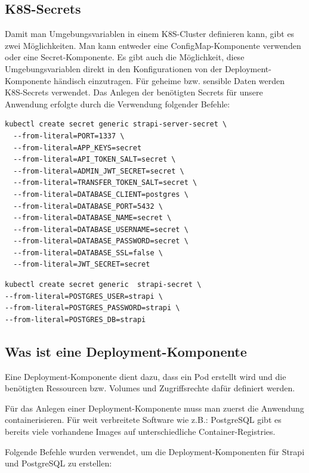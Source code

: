 \subsection{K8S-Secrets}
Damit man Umgebungsvariablen in einem K8S-Cluster definieren kann, gibt es zwei Möglichkeiten.
Man kann entweder eine ConfigMap-Komponente verwenden oder eine Secret-Komponente. Es gibt auch die Möglichkeit, diese Umgebungsvariablen direkt in den Konfigurationen von der Deployment-Komponente händisch einzutragen.
Für geheime bzw. sensible Daten werden K8S-Secrets verwendet.
Das Anlegen der benötigten Secrets für unsere Anwendung erfolgte durch die Verwendung folgender Befehle:
\begin{lstlisting}[caption=Secrets für Strapi]
    kubectl create secret generic strapi-server-secret \
  --from-literal=PORT=1337 \  
  --from-literal=APP_KEYS=secret
  --from-literal=API_TOKEN_SALT=secret \
  --from-literal=ADMIN_JWT_SECRET=secret \
  --from-literal=TRANSFER_TOKEN_SALT=secret \
  --from-literal=DATABASE_CLIENT=postgres \
  --from-literal=DATABASE_PORT=5432 \
  --from-literal=DATABASE_NAME=secret \
  --from-literal=DATABASE_USERNAME=secret \
  --from-literal=DATABASE_PASSWORD=secret \
  --from-literal=DATABASE_SSL=false \
  --from-literal=JWT_SECRET=secret
\end{lstlisting}


\begin{lstlisting}[caption=Secrets für die Datenbank]
kubectl create secret generic  strapi-secret \
--from-literal=POSTGRES_USER=strapi \
--from-literal=POSTGRES_PASSWORD=strapi \
--from-literal=POSTGRES_DB=strapi
\end{lstlisting}








\subsection{Was ist eine Deployment-Komponente}

Eine Deployment-Komponente dient dazu, dass ein Pod erstellt wird und die benötigten Ressourcen bzw. Volumes und Zugriffsrechte
dafür definiert werden.\cite{k8s-deployment}

Für das Anlegen einer Deployment-Komponente muss man zuerst die Anwendung containerisieren.
Für weit verbreitete Software wie z.B.: PostgreSQL gibt es bereits viele vorhandene Images auf unterschiedliche Container-Registries.

Folgende Befehle wurden verwendet, um die Deployment-Komponenten für Strapi und PostgreSQL zu erstellen:

